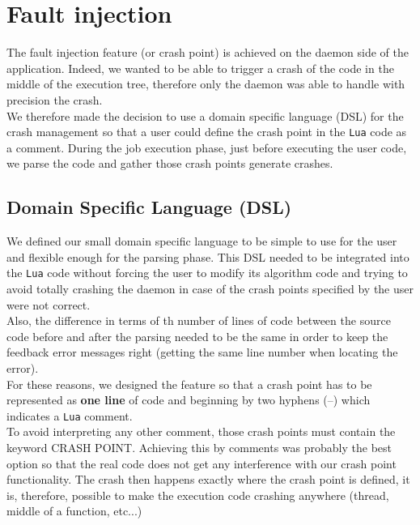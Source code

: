 \documentclass{eplmastersthesis}
\begin{document}
    \section{Fault injection}

      The fault injection feature (or crash point) is achieved on the daemon
      side of the application. Indeed, we wanted to be able to trigger a crash
      of the code in the middle of the execution tree, therefore only the
      daemon was able to handle with precision the crash.\\

      We therefore made the decision to use a domain specific language (DSL)
      for the crash management so that a user could define the crash point
      in the \texttt{Lua} code as a comment. During the job execution phase, just before
      executing the user code, we parse the code and gather those crash
      points generate crashes.

      \subsection{Domain Specific Language (DSL)}

        We defined our small domain specific language to be simple to use
        for the user and flexible enough for the parsing phase. This DSL
        needed to be integrated into the \texttt{Lua} code without forcing the user to
        modify its algorithm code and trying to avoid totally crashing
        the daemon in case of the crash points specified by the user were
        not correct.\\
        Also, the difference in terms of th number of lines of code between the
        source code before and after the parsing needed to be the same in
        order to keep the feedback error messages right (getting the same line
        number when locating the error).\\

        For these reasons, we designed the feature so that a crash point has
        to be represented as \textbf{one line} of code and beginning by
        two hyphens (--) which indicates a \texttt{Lua} comment.\\
        To avoid interpreting any other comment, those crash points must
        contain the keyword \textsc{CRASH POINT}. Achieving this by comments
        was probably the best option so that the real code does not get any
        interference with our crash point functionality. The crash then
        happens exactly where the crash point is defined, it is, therefore,
        possible to make the execution code crashing anywhere (thread, middle
        of a function, etc...)\\
\end{document}
